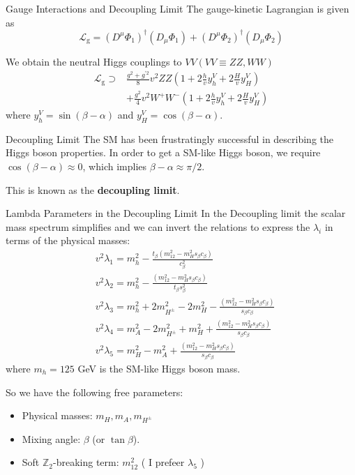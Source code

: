 \documentclass{../bredelebeamer}
\begin{document}
\begin{frame}{Gauge Interactions and Decoupling Limit}
  The gauge-kinetic Lagrangian is given as
  $$
  \mathcal{L}_{\mathrm{g}}=\left(D^\mu \Phi_1\right)^{\dagger}\left(D_\mu \Phi_1\right)+\left(D^\mu \Phi_2\right)^{\dagger}\left(D_\mu \Phi_2\right)
  $$


  We obtain the neutral Higgs couplings to $V V(V V \equiv Z Z, W W)$
  $$
  \begin{aligned}
  \mathcal{L}_{\mathrm{g}} \supset & \frac{g^2+g^{\prime 2}}{8} v^2 Z Z\left(1+2 \frac{h}{v} y_h^V+2 \frac{H}{v} y_H^V\right) \\
  & +\frac{g^2}{4} v^2 W^{+} W^{-}\left(1+2 \frac{h}{v} y_h^V+2 \frac{H}{v} y_H^V\right)
  \end{aligned}
  $$
  where $y_h^V=\sin (\beta-\alpha)$ and $y_H^V=\cos (\beta-\alpha)$.
  \vfill \pause

  

  \begin{block}{Decoupling Limit}
    The SM has been frustratingly successful in describing the Higgs boson properties. In order to get a SM-like Higgs boson, we require $\cos(\beta-\alpha) \approx 0$, which implies $\beta - \alpha \approx \pi/2$. 
    
    This is known as the \textbf{decoupling limit}.
  \end{block}
\end{frame}

\begin{frame}{Lambda Parameters in the Decoupling Limit}
  In the Decoupling limit the scalar mass spectrum simplifies and we can invert the relations to express the $\lambda_i$ in terms of the physical masses:
  \begin{equation}
      \begin{aligned}
        & v^2 \lambda_1=m_h^2-\frac{t_\beta\left(m_{12}^2-m_H^2 s_\beta c_\beta\right)}{c_\beta^2} \\
        & v^2 \lambda_2=m_h^2-\frac{\left(m_{12}^2-m_H^2 s_\beta c_\beta\right)}{t_\beta s_\beta^2} \\
        & v^2 \lambda_3=m_h^2+2 m_{H^{ \pm}}^2-2 m_H^2-\frac{\left(m_{12}^2-m_H^2 s_\beta c_\beta\right)}{s_\beta c_\beta} \\
        & v^2 \lambda_4=m_A^2-2 m_{H^{ \pm}}^2+m_H^2+\frac{\left(m_{12}^2-m_H^2 s_\beta c_\beta\right)}{s_\beta c_\beta} \\
        & v^2 \lambda_5=m_H^2-m_A^2+\frac{\left(m_{12}^2-m_H^2 s_\beta c_\beta\right)}{s_\beta c_\beta}
        \end{aligned}
    \end{equation}
    where $m_h = 125$ GeV is the SM-like Higgs boson mass.\vfill \pause

    So we have the following free parameters:
    \begin{itemize}
      \item Physical masses: $m_H, m_A, m_{H^\pm}$
      \item Mixing angle: $\beta$ (or $\tan\beta$).
      \item Soft $\mathbb{Z}_2$-breaking term: $m_{12}^2$ ( I prefeer $\lambda_5$ )
    \end{itemize}
\end{frame}
\end{document}
